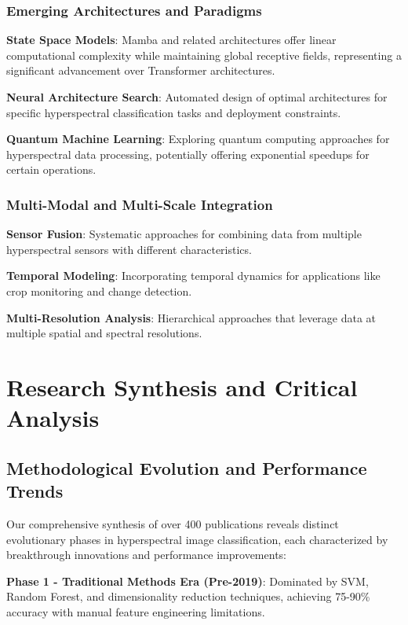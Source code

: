 \documentclass[journal]{IEEEtran}
\begin{document}
\subsubsection{Emerging Architectures and Paradigms}

\textbf{State Space Models}: Mamba and related architectures offer linear computational complexity while maintaining global receptive fields, representing a significant advancement over Transformer architectures.

\textbf{Neural Architecture Search}: Automated design of optimal architectures for specific hyperspectral classification tasks and deployment constraints.

\textbf{Quantum Machine Learning}: Exploring quantum computing approaches for hyperspectral data processing, potentially offering exponential speedups for certain operations.

\subsubsection{Multi-Modal and Multi-Scale Integration}

\textbf{Sensor Fusion}: Systematic approaches for combining data from multiple hyperspectral sensors with different characteristics.

\textbf{Temporal Modeling}: Incorporating temporal dynamics for applications like crop monitoring and change detection.

\textbf{Multi-Resolution Analysis}: Hierarchical approaches that leverage data at multiple spatial and spectral resolutions.

\section{Research Synthesis and Critical Analysis}

\subsection{Methodological Evolution and Performance Trends}

Our comprehensive synthesis of over 400 publications reveals distinct evolutionary phases in hyperspectral image classification, each characterized by breakthrough innovations and performance improvements:

\textbf{Phase 1 - Traditional Methods Era (Pre-2019)}: Dominated by SVM, Random Forest, and dimensionality reduction techniques, achieving 75-90\% accuracy with manual feature engineering limitations.
\end{document}
